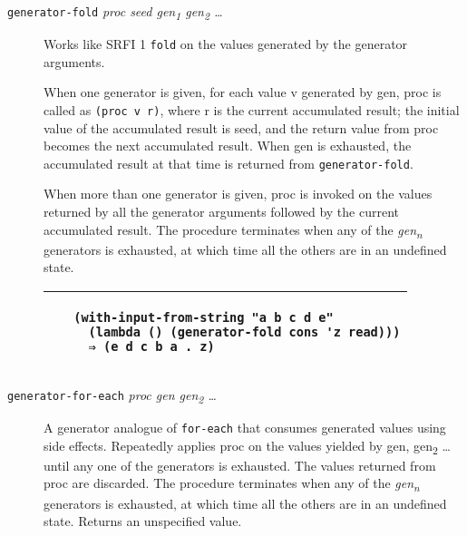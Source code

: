 \begin{description}
\item[\texttt{generator-fold} \emph{proc seed gen\textsubscript{1}
gen\textsubscript{2} \ldots{}}]
Works like SRFI 1 \texttt{fold} on the values generated by the generator
arguments.

When one generator is given, for each value v generated by gen, proc is
called as \texttt{(proc\ v\ r)}, where r is the current accumulated
result; the initial value of the accumulated result is seed, and the
return value from proc becomes the next accumulated result. When gen is
exhausted, the accumulated result at that time is returned from
\texttt{generator-fold}.

When more than one generator is given, proc is invoked on the values
returned by all the generator arguments followed by the current
accumulated result. The procedure terminates when any of the
\emph{gen\textsubscript{n}} generators is exhausted, at which time all
the others are in an undefined state.

\begin{longtable}[]{@{}ll@{}}
\toprule
\begin{minipage}[t]{0.47\columnwidth}\raggedright\strut
~\strut
\end{minipage} & \begin{minipage}[t]{0.47\columnwidth}\raggedright\strut
\begin{verbatim}
(with-input-from-string "a b c d e"
  (lambda () (generator-fold cons 'z read)))
  ⇒ (e d c b a . z)
\end{verbatim}
\strut
\end{minipage}\tabularnewline
\bottomrule
\end{longtable}
\end{description}

\begin{description}
\item[\texttt{generator-for-each} \emph{proc gen gen\textsubscript{2}
\ldots{}}]
A generator analogue of \texttt{for-each} that consumes generated values
using side effects. Repeatedly applies proc on the values yielded by
gen, gen\textsubscript{2} \ldots{} until any one of the generators is
exhausted. The values returned from proc are discarded. The procedure
terminates when any of the \emph{gen\textsubscript{n}} generators is
exhausted, at which time all the others are in an undefined state.
Returns an unspecified value.
\end{description}

